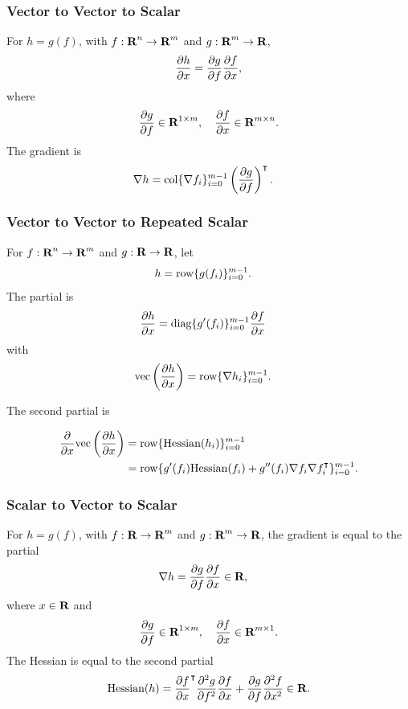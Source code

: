 \documentclass{article}
\begin{document}
        \subsubsection{Vector to Vector to Scalar}
        For $h=g(f)$, with $f:\textbf{R}^n\to\textbf{R}^m$ and $g:\textbf{R}^m\to\textbf{R}$,
        \begin{align*}
            \frac{\partial h}{\partial x}=\frac{\partial g}{\partial f}\frac{\partial f}{\partial x},
        \end{align*}
        where 
        \begin{align*}
            \frac{\partial g}{\partial f}\in\textbf{R}^{1\times m}, \quad 
            \frac{\partial f}{\partial x}\in\textbf{R}^{m\times n}.
        \end{align*}
        The gradient is
        \begin{align*}
            \nabla h
            &
            =\text{col}\{\nabla f_i\}_{i=0}^{m-1} \left(\frac{\partial g}{\partial f}\right)^\intercal.
        \end{align*}

    
    \subsubsection{Vector to Vector to Repeated Scalar}
        For $f:\textbf{R}^n\to\textbf{R}^m$ and $g:\textbf{R}\to\textbf{R}$, let
        \begin{align*}
            h&=\text{row}\{g(f_i)\}_{i=0}^{m-1}.
        \end{align*}
        The partial is
        \begin{align*}
            \frac{\partial h}{\partial x}&=\text{diag}\{g'(f_i)\}_{i=0}^{m-1}\frac{\partial f}{\partial x}
        \end{align*}
        with
        \begin{align*}
            \mathrm{vec}\left(\frac{\partial h}{\partial x}\right)&=\text{row}\{\nabla h_i\}_{i=0}^{m-1}.
        \end{align*}
    
        The second partial is

        \begin{align*}
            \frac{\partial }{\partial x}\mathrm{vec}\left(\frac{\partial h}{\partial x}\right)&=\text{row}\{\text{Hessian}(h_i)\}_{i=0}^{m-1}\\
            &=\text{row}\{g'(f_i)\text{Hessian}(f_i)+g''(f_i)\nabla f_i\nabla f_i^\intercal\}_{i=0}^{m-1}.
        \end{align*}

    \subsubsection{Scalar to Vector to Scalar}
        For $h=g(f)$, with $f:\textbf{R}\to\textbf{R}^m$ and $g:\textbf{R}^m\to\textbf{R}$,
        the gradient is equal to the partial
        \begin{align*}
            \nabla h&=\frac{\partial g}{\partial f}\frac{\partial f}{\partial x}\in\textbf{R},
        \end{align*}
        where $x\in\textbf{R}$ and
        \begin{align*}
            \frac{\partial g}{\partial f}\in\textbf{R}^{1\times m},\quad
            \frac{\partial f}{\partial x}\in\textbf{R}^{m\times 1}.
        \end{align*}
        The Hessian is equal to the second partial
        \begin{align*}
            \text{Hessian}(h)
            =\frac{\partial f}{\partial x}^\intercal\frac{\partial^2 g}{ \partial f^2}\frac{\partial f}{\partial x}
                +\frac{\partial g}{\partial f}\frac{\partial^2 f}{ \partial x^2}\in\textbf{R}.
        \end{align*}
\end{document}
